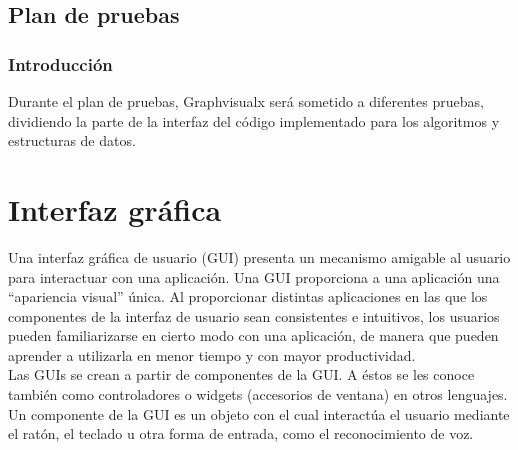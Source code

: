 \documentclass[a4paper,12pt]{article}
\begin{document}
\subsection{Plan de pruebas}

\subsubsection{Introducción}

Durante el plan de pruebas, Graphvisualx será sometido a diferentes pruebas, dividiendo la parte de la interfaz del código implementado para los algoritmos y estructuras de datos.\\
\section{Interfaz gráfica}

Una interfaz gráfica de usuario (GUI) presenta un mecanismo amigable al usuario para interactuar con una aplicación. Una GUI proporciona a una aplicación una ``apariencia visual'' única. Al proporcionar distintas aplicaciones en las que los componentes de la interfaz de usuario sean consistentes e intuitivos, los usuarios pueden familiarizarse en cierto modo con una aplicación, de manera que pueden aprender a utilizarla en menor tiempo y con mayor productividad.\\

Las GUIs se crean a partir de componentes de la GUI. A éstos se les conoce también como controladores o widgets (accesorios de ventana) en otros lenguajes. Un componente de la GUI es un objeto con el cual interactúa el usuario mediante el ratón, el teclado u otra forma de entrada, como el reconocimiento de voz.\\


\clearpage
\nocite{*}


\pagestyle{empty}
\end{document}
